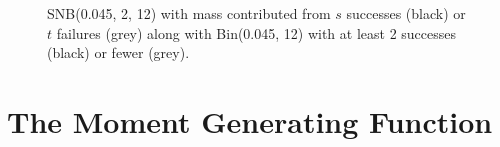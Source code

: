 \documentclass[review]{elsarticle}
\begin{document}
\begin{figure}[t!]
\centering
{}
\hfill
{}
\caption{
SNB(0.045, 2, 12) with mass contributed from 
$s$ successes (black) or $t$ failures (grey) along with Bin(0.045, 12) with
at least 2 successes (black) or fewer (grey).
}
\label{fig:snb_bin_compare}
\end{figure}

\section{The Moment Generating Function}
\end{document}
